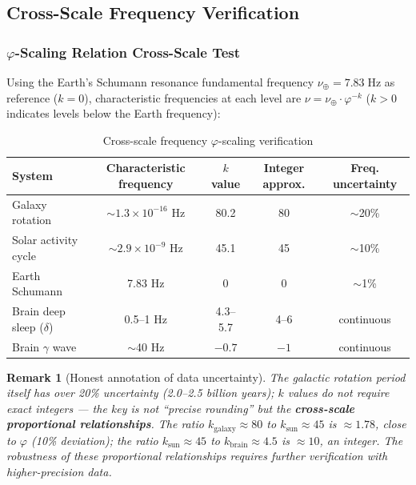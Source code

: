 \documentclass[12pt,a4paper,twocolumn]{article}
\renewcommand{\phi}{\varphi}
\newtheorem{remark}[theorem]{Remark}
\begin{document}
\subsection{Cross-Scale Frequency Verification}
\label{subsec:cross_scale}

\subsubsection{$\phi$-Scaling Relation Cross-Scale Test}

Using the Earth's Schumann resonance fundamental frequency $\nu_{\oplus} = 7.83\;\text{Hz}$ as reference ($k=0$), characteristic frequencies at each level are $\nu = \nu_{\oplus} \cdot \phi^{-k}$ ($k>0$ indicates levels below the Earth frequency):

\begin{table}[htbp]
\centering
\caption{Cross-scale frequency $\phi$-scaling verification}
\label{tab:cross_scale_en}
\begin{tabular}{lcccc}
\hline
System & Characteristic frequency & $k$ value & Integer approx. & Freq. uncertainty \\
\hline
Galaxy rotation & $\sim 1.3\times10^{-16}$ Hz & 80.2 & 80 & $\sim$20\% \\
Solar activity cycle & $\sim 2.9\times10^{-9}$ Hz & 45.1 & 45 & $\sim$10\% \\
Earth Schumann & 7.83 Hz & 0 & 0 & $\sim$1\% \\
Brain deep sleep ($\delta$) & 0.5--1 Hz & 4.3--5.7 & 4--6 & continuous \\
Brain $\gamma$ wave & $\sim$40 Hz & $-0.7$ & $-1$ & continuous \\
\hline
\end{tabular}
\end{table}

\begin{remark}[Honest annotation of data uncertainty]
\label{rmk:cross_scale_caveat_en}
The galactic rotation period itself has over 20\% uncertainty (2.0--2.5 billion years); $k$ values do not require exact integers --- the key is not ``precise rounding'' but the \textbf{cross-scale proportional relationships}. The ratio $k_{\text{galaxy}}\approx 80$ to $k_{\text{sun}}\approx 45$ is $\approx 1.78$, close to $\phi$ (10\% deviation); the ratio $k_{\text{sun}}\approx 45$ to $k_{\text{brain}}\approx 4.5$ is $\approx 10$, an integer. The robustness of these proportional relationships requires further verification with higher-precision data.
\end{remark}
\end{document}
